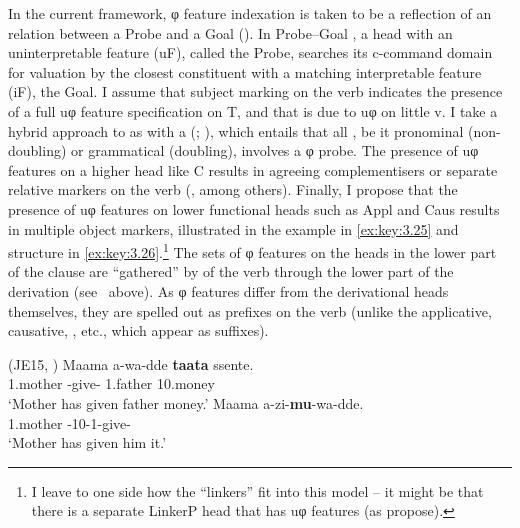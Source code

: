 \documentclass[output=paper]{langsci/langscibook}
\begin{document}
In the current framework, φ feature indexation is taken to be a reflection of
an  relation between a Probe and a Goal (\citealt{Chomsky2000,Chomsky2001}). In
Probe--Goal , a head with an uninterpretable feature (uF), called the
Probe, searches its c-command domain for valuation by the closest constituent
with a matching interpretable feature (iF), the Goal. I assume that subject
marking on the verb indicates the presence of a full uφ feature specification
on T, and that  is due to uφ on little v. I take a hybrid
approach to  as  with a 
(\citealt{Roberts2010,Iorio2014}; ), which
entails that all , be it pronominal (non-doubling) or grammatical
(doubling), involves a φ probe. The presence of uφ features on a higher head
like C results in agreeing complementisers or separate relative markers on the
verb (\citealt{Carstens2003,Henderson2011}, among others). Finally,
I propose that the presence of uφ features on lower functional heads such as
Appl and Caus results in multiple object markers, illustrated in the example in
\eqref{ex:key:3.25} and structure in \eqref{ex:key:3.26}.\footnote{I leave to
    one side how the  \enquote{linkers}
    \parencite{BakerCollins2006,Schneider-Zioga2015} fit into this model -- it
    might be that there is a separate LinkerP head that has uφ features (as
\citealt{BakerCollins2006} propose).} The sets of φ features on the heads in
the lower part of the clause are “gathered” by  of the verb
through the lower part of the derivation (see~ above).  As φ
features differ from the derivational heads themselves, they are spelled out as
prefixes on the verb (unlike the applicative, causative, , etc., which
appear as suffixes).

\ea\label{ex:key:3.25}  (JE15, \citealt[67, 72]{Ssekiryango2006})\label{bkm:Ref286389666}
    \ea
    \gll Maama  a-wa-dde  \textbf{taata}  ssente.\\
        1.mother  \First\Sm{}-give-\Pfv{}  1.father  10.money\\
    \glt    ‘Mother has given father money.’
    \ex
    \gll Maama  a-zi-\textbf{mu}-wa-dde. \\
        1.mother  \First\Sm{}{}-10\Om{}-1\Om{}-give-\Pfv{} \\
    \glt    ‘Mother has given him it.’
    \z
\z
\end{document}
